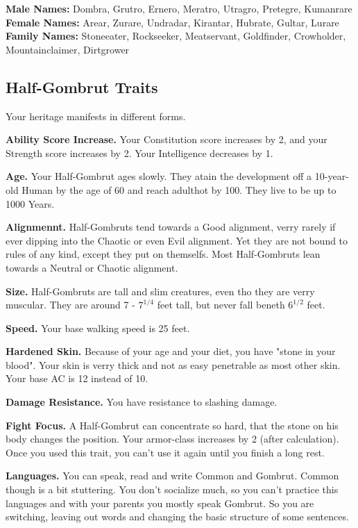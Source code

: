\documentclass[10pt,twoside,twocolumn,openany]{book}
\begin{document}
\textbf{Male Names:}
Dombra, Grutro, Ernero, Meratro, Utragro, Pretegre, Kumanrare
\textbf{Female Names:}
Arear, Zurare, Undradar, Kirantar, Hubrate, Gultar, Lurare
\textbf{Family Names:}
Stoneeater, Rockseeker, Meatservant, Goldfinder, Crowholder, Mountainclaimer, Dirtgrower

\subsection{Half-Gombrut Traits}
Your heritage manifests in different forms.

\textbf{Ability Score Increase.} Your Constitution score increases by 2, and your Strength score increases by 2. Your Intelligence decreases by 1.

\textbf{Age.} Your Half-Gombrut ages slowly. They atain the development off a 10-year-old Human by the age of 60 and reach adulthot by 100. They live to be up to 1000 Years.

\textbf{Alignmennt.} Half-Gombruts tend towards a Good alignment, verry rarely if ever dipping into the Chaotic or even Evil alignment. Yet they are not bound to rules of any kind, except they put on themselfs. Most Half-Gombruts lean towards a Neutral or Chaotic alignment.

\textbf{Size.} Half-Gombruts are tall and slim creatures, even tho they are verry muscular. They are around 7 - $7^{1/4}$ feet tall, but never fall beneth $6^{1/2}$ feet.

\textbf{Speed.} Your base walking speed is 25 feet.

\textbf{Hardened Skin.} Because of your age and your diet, you have "stone in your blood". Your skin is verry thick and not as easy penetrable as most other skin. Your base AC is 12 instead of 10.

\textbf{Damage Resistance.} You have resistance to slashing damage.

\textbf{Fight Focus.} A Half-Gombrut can concentrate so hard, that the stone on his body changes the position. Your armor-class increases by 2 (after calculation). Once you used this trait, you can't use it again until you finish a long rest.

\textbf{Languages.} You can speak, read and write Common and Gombrut. Common though is a bit stuttering. You don't socialize much, so you can't practice this languages and with your parents you mostly speak Gombrut. So you are switching, leaving out words and changing the basic structure of some sentences.
\end{document}
